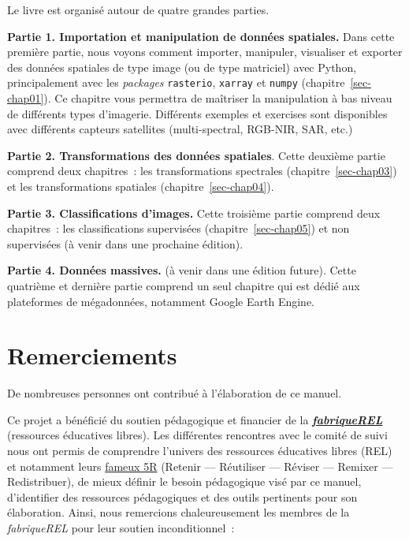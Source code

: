 \documentclass[
  11pt,
  letterpaper,
  open=any,
  twoside=false,
  french]{scrbook}
\begin{document}

Le livre est organisé autour de quatre grandes parties.

\textbf{Partie 1. Importation et manipulation de données spatiales.}
Dans cette première partie, nous voyons comment importer, manipuler,
visualiser et exporter des données spatiales de type image (ou de type
matriciel) avec Python, principalement avec les \emph{packages}
\texttt{rasterio}, \texttt{xarray} et \texttt{numpy}
(chapitre~\ref{sec-chap01}). Ce chapitre vous permettra de maîtriser la
manipulation à bas niveau de différents types d'imagerie. Différents
exemples et exercises sont disponibles avec différents capteurs
satellites (multi-spectral, RGB-NIR, SAR, etc.)

\textbf{Partie 2. Transformations des données spatiales}. Cette deuxième
partie comprend deux chapitres~: les transformations spectrales
(chapitre~\ref{sec-chap03}) et les transformations spatiales
(chapitre~\ref{sec-chap04}).

\textbf{Partie 3. Classifications d'images.} Cette troisième partie
comprend deux chapitres~: les classifications supervisées
(chapitre~\ref{sec-chap05}) et non supervisées (à venir dans une
prochaine édition).

\textbf{Partie 4. Données massives.} (à venir dans une édition future).
Cette quatrième et dernière partie comprend un seul chapitre qui est
dédié aux plateformes de mégadonnées, notamment Google Earth Engine.

\section*{Remerciements}\label{sect005}


De nombreuses personnes ont contribué à l'élaboration de ce manuel.

Ce projet a bénéficié du soutien pédagogique et financier de la
\href{https://fabriquerel.org/}{\textbf{\emph{fabriqueREL}}} (ressources
éducatives libres). Les différentes rencontres avec le comité de suivi
nous ont permis de comprendre l'univers des ressources éducatives libres
(REL) et notamment leurs \href{https://fabriquerel.org/rel/}{fameux 5R}
(Retenir --- Réutiliser --- Réviser --- Remixer --- Redistribuer), de
mieux définir le besoin pédagogique visé par ce manuel, d'identifier des
ressources pédagogiques et des outils pertinents pour son élaboration.
Ainsi, nous remercions chaleureusement les membres de la
\emph{fabriqueREL} pour leur soutien inconditionnel~:
\end{document}
